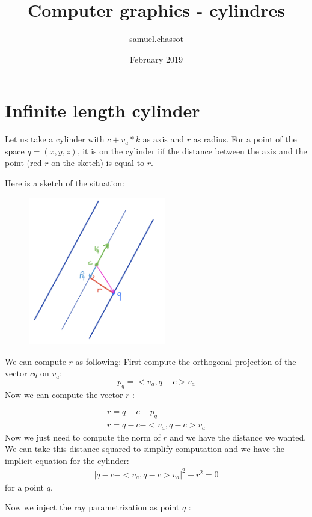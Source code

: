 \documentclass{article}
\title{Computer graphics - cylindres}
\author{samuel.chassot }
\date{February 2019}
\begin{document}
\maketitle

\section{Infinite length cylinder}
Let us take a cylinder with $c + v_a*k$ as axis and $r$ as radius. For a point of the space $q = (x,y,z)$, it is on the cylinder iif the distance between the axis and the point (red $r$ on the sketch) is equal to $r$.

Here is a sketch of the situation:
\begin{figure}[h]
\centering
\includegraphics[width=6cm]{res/Cylinder_sketch.jpeg}
\end{figure}

We can compute $r$ as following:
First compute the orthogonal projection of the vector $c q$ on $v_a$:
$$p_q = <v_a, q-c> v_a$$
Now we can compute the vector $r$ :

\begin{gather*}
    r = q-c-p_q \\
    r = q-c - <v_a, q-c> v_a
\end{gather*}
Now we just need to compute the norm of $r$ and we have the distance we wanted. We can take this distance squared to simplify computation and we have the implicit equation for the cylinder:
\begin{gather*}
    |q-c-<v_a, q-c> v_a|^2 -r^2 = 0
\end{gather*}
for a point $q$.

Now we inject the ray parametrization as point $q$ :
\end{document}
